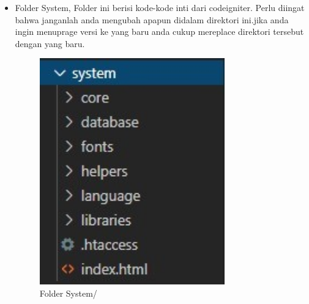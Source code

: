 \begin{itemize}
\begin{itemize}
		\item Folder System, Folder ini berisi kode-kode inti dari codeigniter. Perlu diingat bahwa janganlah anda mengubah apapun didalam direktori ini.jika anda ingin menuprage versi ke yang baru anda cukup mereplace direktori tersebut dengan yang baru.
		\begin{figure}[H]
			\includegraphics[width=8cm]{figures/instalasi/ci8-1.jpg}
			\centering
			\caption{Folder System/}
		\end{figure}			
		

\end{itemize}
\end{itemize}
